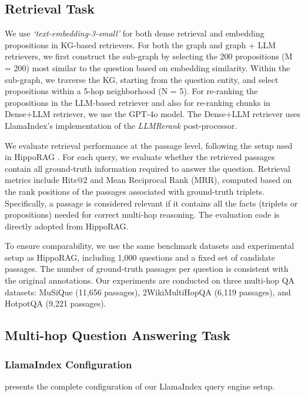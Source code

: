 \documentclass{article} %
\begin{document}
\subsection{Retrieval Task} \label{appendix-graph_llm}
We use \textit{`text-embedding-3-small'} for both dense retrieval and embedding propositions in KG-based retrievers. For both the graph and graph + LLM retrievers, we first construct the sub-graph by selecting the 200 propositions (M = 200) most similar to the question based on embedding similarity. Within the sub-graph, we traverse the KG, starting from the question entity, and select propositions within a 5-hop neighborhood (N = 5). For re-ranking the propositions in the LLM-based retriever and also for re-ranking chunks in Dense+LLM retriever, we use the GPT-4o model. The Dense+LLM retriever uses LlamaIndex's implementation of the \textit{LLMRerank} post-processor.

We evaluate retrieval performance at the passage level, following the setup used in HippoRAG
. For each query, we evaluate whether the retrieved passages contain all ground-truth information required to answer the question. Retrieval metrics include Hits@2 and Mean Reciprocal Rank (MRR), computed based on the rank positions of the passages associated with ground-truth triplets. Specifically, a passage is considered relevant if it contains all the facts (triplets or propositions) needed for correct multi-hop reasoning. The evaluation code is directly adopted from HippoRAG.

To ensure comparability, we use the same benchmark datasets and experimental setup as HippoRAG, including 1,000 questions and a fixed set of candidate passages. The number of ground-truth passages per question is consistent with the original annotations. Our experiments are conducted on three multi-hop QA datasets: MuSiQue (11,656 passages), 2WikiMultiHopQA (6,119 passages), and HotpotQA (9,221 passages).

\subsection{Multi-hop Question Answering Task}
\subsubsection{LlamaIndex Configuration} \label{sec:llama-index-config}

 presents the complete configuration of our LlamaIndex query engine setup.
\end{document}
